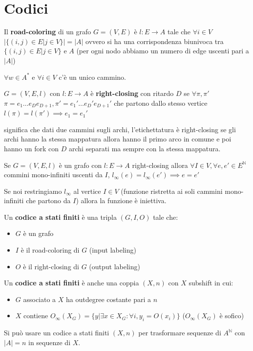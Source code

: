 \section{Codici}
\begin{definizione} 
    Il \textbf{road-coloring} di un grafo $G=(V,E)$ è $l:E\to A$ tale che $\forall
        i\in V$ $|\{(i,j)\in E|j\in V\}| = |A|$ ovvero si ha una corrispondenza biunivoca tra $\{(i,j)\in E|j\in V\}$ e $A$
    (per ogni nodo abbiamo un numero di edge uscenti pari a $|A|$)
\end{definizione}
\begin{nota}
    $\forall w \in A^\ast$ e $\forall i\in V$ c'è un unico cammino.
\end{nota}
\begin{definizione} 
    $G = (V,E,l)$ con $l:E\to A$ è \textbf{right-closing} con ritardo $D$ se $\forall \pi,\pi'$
    $\pi = e_1\dots e_De_{D+1},\pi' = e_1'\dots e_D'e_{D+1}'$ che partono dallo
    stesso vertice $l(\pi)=l(\pi')\implies e_1=e_1'$
\end{definizione}
significa che dati due cammini sugli archi, l'etichettatura è right-closing se gli archi hanno la
stessa mappatura allora hanno il primo arco in comune e poi hanno un fork con $D$
archi separati ma sempre con la stessa mappatura.
\begin{nota}
    Se $G = (V,E,l)$  è un grafo con $l:E\to A$ right-closing allora $\forall I\in V,
        \forall e,e'\in E^\mathbb{N}$ commini mono-infiniti uscenti da $I$, $l_\infty(e) = l_\infty(e') \implies e=e'$
\end{nota}
Se noi restringiamo $l_\infty$ al vertice $I\in V$ (funzione ristretta ai soli
cammini mono-infiniti che partono da $I$) allora la funzione è iniettiva.

\begin{definizione}
    Un \textbf{codice a stati finiti} è una tripla $(G,I,O)$ tale che:
    \begin{itemize}
        \item $G$ è un grafo
        \item $I$ è il road-coloring di $G$ (input labeling)
        \item $O$ è il right-closing di $G$ (output labeling)
    \end{itemize}
\end{definizione}

\begin{definizione}
    Un \textbf{codice a stati finiti} è anche una coppia $(X,n)$ con $X$ subshift in cui:
    \begin{itemize}
        \item $G$ associato a $X$ ha outdegree costante pari a $n$
        \item $X$ contiene $O_\infty(X_G)=\{y | \exists x\in X_G:\forall i,y_i=O(x_i)\}$ ($O_\infty(X_G)$ è sofico)
    \end{itemize}
\end{definizione}
Si può usare un codice a stati finiti $(X,n)$ per trasformare sequenze di $A^\mathbb{N}$
con $|A|=n$ in sequenze di $X$.


